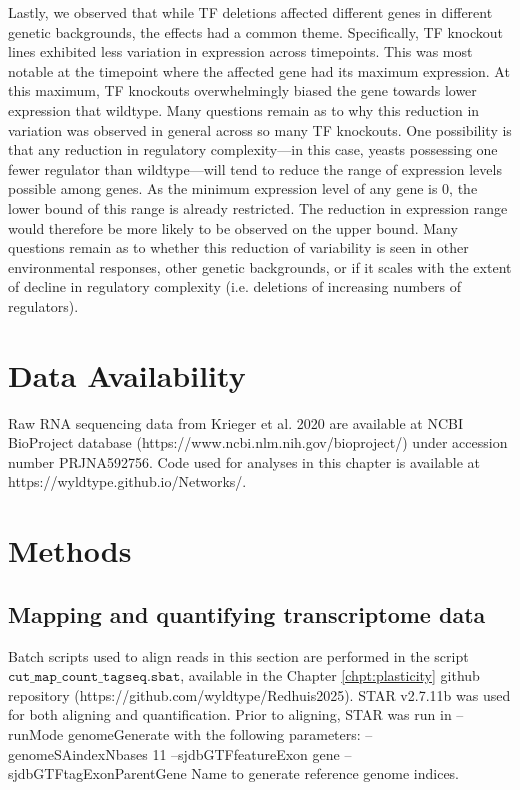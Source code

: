 Lastly, we observed that while TF deletions affected different genes in different genetic backgrounds, the effects had a common theme. Specifically, TF knockout lines exhibited less variation in expression across timepoints. This was most notable at the timepoint where the affected gene had its maximum expression. At this maximum, TF knockouts overwhelmingly biased the gene towards lower expression that wildtype. Many questions remain as to why this reduction in variation was observed in general across so many TF knockouts. One possibility is that any reduction in regulatory complexity---in this case, yeasts possessing one fewer regulator than wildtype---will tend to reduce the range of expression levels possible among genes. As the minimum expression level of any gene is 0, the lower bound of this range is already restricted. The reduction in expression range would therefore be more likely to be observed on the upper bound. Many questions remain as to whether this reduction of variability is seen in other environmental responses, other genetic backgrounds, or if it scales with the extent of decline in regulatory complexity (i.e. deletions of increasing numbers of regulators).

\section{Data Availability}

Raw RNA sequencing data from Krieger et al. 2020 are available at NCBI BioProject database (https://www.ncbi.nlm.nih.gov/bioproject/) under accession number PRJNA592756. Code used for analyses in this chapter is available at https://wyldtype.github.io/Networks/.

\section{Methods}

\subsection{Mapping and quantifying transcriptome data}

Batch scripts used to align reads in this section are performed in the script $\texttt{cut\_map\_count\_tagseq.sbat}$, available in the Chapter \ref{chpt:plasticity} github repository (https://github.com/wyldtype/Redhuis2025). STAR v2.7.11b was used for both aligning and quantification. Prior to aligning, STAR was run in --runMode genomeGenerate with the following parameters: --genomeSAindexNbases 11 --sjdbGTFfeatureExon gene --sjdbGTFtagExonParentGene Name to generate reference genome indices.

